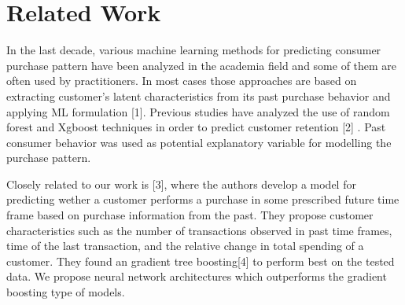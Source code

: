 \section{Related Work}
In the last decade, various machine learning methods for predicting consumer purchase pattern have been analyzed in
the academia field and some of them are often used by practitioners. In most cases those approaches are based on extracting 
customer’s latent characteristics from its past purchase behavior and applying ML formulation [1]. 
Previous studies have analyzed the use of random forest and Xgboost techniques in order to predict 
customer retention [2] . Past consumer behavior was used as potential explanatory variable 
for modelling the purchase pattern. 

Closely related to our work is [3], where the authors develop a model for predicting wether a customer performs a 
purchase in some prescribed future time frame based on purchase information from the past. 
They propose customer characteristics such as the number of transactions observed in past time frames, 
time of the last transaction, and the relative change
in total spending of a customer. They found an gradient tree boosting[4] to perform best on the
tested data. We propose neural network architectures which outperforms the gradient boosting type of models.
